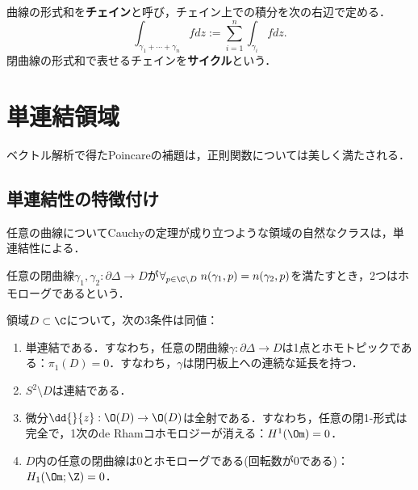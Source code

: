 \documentclass[uplatex, dvipdfmx]{jsreport}
\begin{document}
\begin{definition}
    曲線の形式和を\textbf{チェイン}と呼び，チェイン上での積分を次の右辺で定める．
    \[\int_{\gamma_1+\cdots+\gamma_n}fdz:=\sum_{i=1}^n\int_{\gamma_i}fdz.\]
    閉曲線の形式和で表せるチェインを\textbf{サイクル}という．
\end{definition}

\section{単連結領域}

\begin{tcolorbox}[colframe=ForestGreen, colback=ForestGreen!10!white,breakable,colbacktitle=ForestGreen!40!white,coltitle=black,fonttitle=\bfseries\sffamily,
title=]
    ベクトル解析で得たPoincareの補題は，正則関数については美しく満たされる．
\end{tcolorbox}

\subsection{単連結性の特徴付け}

\begin{tcolorbox}[colframe=ForestGreen, colback=ForestGreen!10!white,breakable,colbacktitle=ForestGreen!40!white,coltitle=black,fonttitle=\bfseries\sffamily,
title=]
    任意の曲線についてCauchyの定理が成り立つような領域の自然なクラスは，単連結性による．
\end{tcolorbox}

\begin{definition}[homologue]
    任意の閉曲線$\gamma_1,\gamma_2:\partial\Delta\to D$が$\forall_{p\in\C\setminus D}\;n(\gamma_1,p)=n(\gamma_2,p)$を満たすとき，2つはホモローグであるという．
\end{definition}

\begin{proposition}[単連結性の特徴付け]
    領域$D\subset\C$について，次の3条件は同値：
    \begin{enumerate}
        \item 単連結である．すなわち，任意の閉曲線$\gamma:\partial\Delta\to D$は1点とホモトピックである：$\pi_1(D)=0$．すなわち，$\gamma$は閉円板上への連続な延長を持つ．
        \item $S^2\setminus D$は連結である．
        \item 微分$\dd{}{z}:\O(D)\to\O(D)$は全射である．すなわち，任意の閉1-形式は完全で，1次のde Rhamコホモロジーが消える：$H^1(\Om)=0$．
        \item $D$内の任意の閉曲線は$0$とホモローグである(回転数が$0$である)：$H_1(\Om;\Z)=0$．
    \end{enumerate}
\end{proposition}
\end{document}
